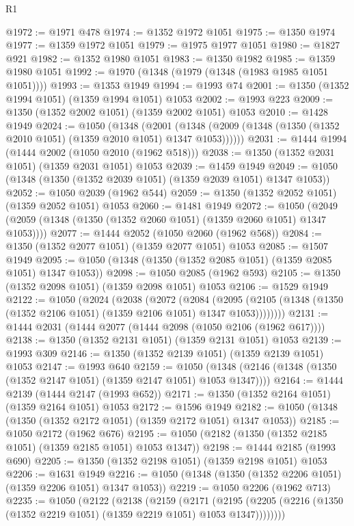 \begin{lexlean}{R1}
\begin{coremodule}
@1972 := @1971 @478
@1974 := @1352 @1972 @1051
@1975 := @1350 @1974
@1977 := @1359 @1972 @1051
@1979 := @1975 @1977 @1051
@1980 := @1827 @921
@1982 := @1352 @1980 @1051
@1983 := @1350 @1982
@1985 := @1359 @1980 @1051
@1992 := @1970 (@1348 (@1979 (@1348 (@1983 @1985 @1051 @1051))))
@1993 := @1353 @1949
@1994 := @1993 @74
@2001 := @1350 (@1352 @1994 @1051) (@1359 @1994 @1051) @1053
@2002 := @1993 @223
@2009 := @1350 (@1352 @2002 @1051) (@1359 @2002 @1051) @1053
@2010 := @1428 @1949
@2024 := @1050
    (@1348
      (@2001 (@1348 (@2009 (@1348 (@1350 (@1352 @2010 @1051) (@1359 @2010 @1051) @1347 @1053))))))
@2031 := @1444 @1994 (@1444 @2002 (@1050 @2010 (@1962 @518)))
@2038 := @1350 (@1352 @2031 @1051) (@1359 @2031 @1051) @1053
@2039 := @1459 @1949
@2049 := @1050 (@1348 (@1350 (@1352 @2039 @1051) (@1359 @2039 @1051) @1347 @1053))
@2052 := @1050 @2039 (@1962 @544)
@2059 := @1350 (@1352 @2052 @1051) (@1359 @2052 @1051) @1053
@2060 := @1481 @1949
@2072 := @1050 (@2049 (@2059 (@1348 (@1350 (@1352 @2060 @1051) (@1359 @2060 @1051) @1347 @1053))))
@2077 := @1444 @2052 (@1050 @2060 (@1962 @568))
@2084 := @1350 (@1352 @2077 @1051) (@1359 @2077 @1051) @1053
@2085 := @1507 @1949
@2095 := @1050 (@1348 (@1350 (@1352 @2085 @1051) (@1359 @2085 @1051) @1347 @1053))
@2098 := @1050 @2085 (@1962 @593)
@2105 := @1350 (@1352 @2098 @1051) (@1359 @2098 @1051) @1053
@2106 := @1529 @1949
@2122 := @1050
    (@2024
      (@2038
        (@2072
          (@2084
            (@2095 (@2105 (@1348 (@1350 (@1352 @2106 @1051) (@1359 @2106 @1051) @1347 @1053))))))))
@2131 := @1444 @2031 (@1444 @2077 (@1444 @2098 (@1050 @2106 (@1962 @617))))
@2138 := @1350 (@1352 @2131 @1051) (@1359 @2131 @1051) @1053
@2139 := @1993 @309
@2146 := @1350 (@1352 @2139 @1051) (@1359 @2139 @1051) @1053
@2147 := @1993 @640
@2159 := @1050 (@1348 (@2146 (@1348 (@1350 (@1352 @2147 @1051) (@1359 @2147 @1051) @1053 @1347))))
@2164 := @1444 @2139 (@1444 @2147 (@1993 @652))
@2171 := @1350 (@1352 @2164 @1051) (@1359 @2164 @1051) @1053
@2172 := @1596 @1949
@2182 := @1050 (@1348 (@1350 (@1352 @2172 @1051) (@1359 @2172 @1051) @1347 @1053))
@2185 := @1050 @2172 (@1962 @676)
@2195 := @1050 (@2182 (@1350 (@1352 @2185 @1051) (@1359 @2185 @1051) @1053 @1347))
@2198 := @1444 @2185 (@1993 @690)
@2205 := @1350 (@1352 @2198 @1051) (@1359 @2198 @1051) @1053
@2206 := @1631 @1949
@2216 := @1050 (@1348 (@1350 (@1352 @2206 @1051) (@1359 @2206 @1051) @1347 @1053))
@2219 := @1050 @2206 (@1962 @713)
@2235 := @1050
    (@2122
      (@2138
        (@2159
          (@2171
            (@2195 (@2205 (@2216 (@1350 (@1352 @2219 @1051) (@1359 @2219 @1051) @1053 @1347))))))))

\end{coremodule}
\end{lexlean}
